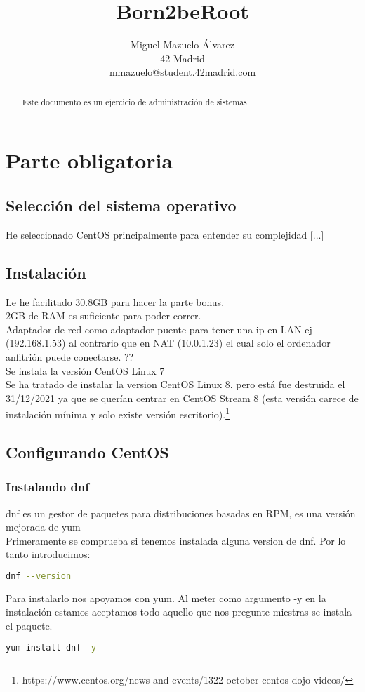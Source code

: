 \documentclass[a4paper]{article}
\title{Born2beRoot}
\author{Miguel Mazuelo Álvarez\\
  \small 42 Madrid\\
  \small mmazuelo@student.42madrid.com\\
  \date{}
}
\begin{document}
\maketitle

\begin{abstract}
Este documento es un ejercicio de administración de sistemas.
\end{abstract}

\section{Parte obligatoria}
\subsection{Selecci\'on del sistema operativo}
He seleccionado CentOS principalmente para entender su complejidad [...]

\subsection{Instalaci\'on}
Le he facilitado 30.8GB para hacer la parte bonus. \\
2GB de RAM es suficiente para poder correr. \\
Adaptador de red como adaptador puente para tener una ip en LAN ej (192.168.1.53) al contrario que en NAT (10.0.1.23) el cual solo el ordenador anfitrión puede conectarse. ?? \\
Se instala la versión CentOS Linux 7 \\
Se ha tratado de instalar la version CentOS Linux 8. pero está fue destruida el 31/12/2021 ya que se querían centrar en CentOS Stream 8 (esta versión carece de instalación mínima y solo existe versión escritorio).\footnote{https://www.centos.org/news-and-events/1322-october-centos-dojo-videos/}

\subsection{Configurando CentOS}
\subsubsection{Instalando dnf}
dnf es un gestor de paquetes para distribuciones basadas en RPM, es una versión mejorada de yum 
\\
Primeramente se comprueba si tenemos instalada alguna version de dnf. Por lo tanto introducimos:
\begin{lstlisting}[language=Bash]
dnf --version
\end{lstlisting}
Para instalarlo nos apoyamos con yum. Al meter como argumento -y en la instalación estamos aceptamos todo aquello que nos pregunte miestras se instala el paquete.
\begin{lstlisting}[language=Bash]
yum install dnf -y
\end{lstlisting}
\end{document}
